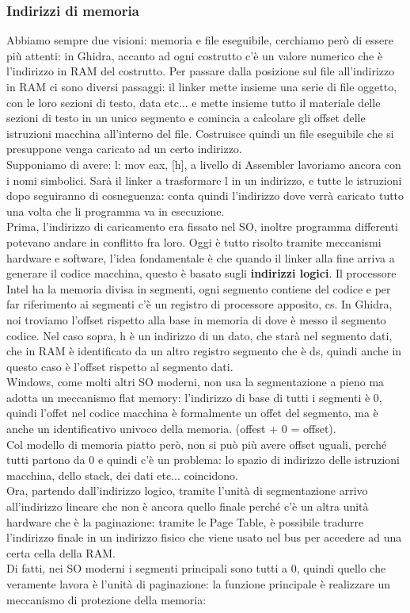 \documentclass[12pt, oneside]{extbook}
\begin{document}
\subsubsection{Indirizzi di memoria}
Abbiamo sempre due visioni: memoria e file eseguibile, cerchiamo però di essere più attenti: in Ghidra, accanto ad ogni costrutto c'è un valore numerico che è l'indirizzo in RAM del costrutto. Per passare dalla posizione sul file all'indirizzo in RAM ci sono diversi passaggi: il linker mette insieme una serie di file oggetto, con le loro sezioni di testo, data etc... e mette insieme tutto il materiale delle sezioni di testo in un unico segmento e comincia a calcolare gli offset delle istruzioni macchina all'interno del file. Costruisce quindi un file eseguibile che si presuppone venga caricato ad un certo indirizzo.\\ Supponiamo di avere: \textsf{l: mov eax, [h]}, a livello di Assembler lavoriamo ancora con i nomi simbolici. Sarà il linker a trasformare l in un indirizzo, e tutte le istruzioni dopo seguiranno di cosneguenza: conta quindi l'indirizzo dove verrà caricato tutto una volta che li programma va in esecuzione.\\ Prima, l'indirizzo di caricamento era fissato nel SO, inoltre programma differenti potevano andare in conflitto fra loro. Oggi è tutto risolto tramite meccanismi hardware e software, l'idea fondamentale è che quando il linker alla fine arriva a generare il codice macchina, questo è basato sugli \textbf{indirizzi logici}. Il processore Intel ha la memoria divisa in segmenti, ogni segmento contiene del codice e per far riferimento ai segmenti c'è un registro di processore apposito, \textsf{cs}. In Ghidra, noi troviamo l'offset rispetto alla base in memoria di dove è messo il segmento codice. Nel caso sopra, h è un indirizzo di un dato, che starà nel segmento dati, che in RAM è identificato da un altro registro segmento che è \textsf{ds}, quindi anche in questo caso è l'offset rispetto al segmento dati.\\ Windows, come molti altri SO moderni, non usa la segmentazione a pieno ma adotta un meccanismo flat memory: l'indirizzo di base di tutti i segmenti è 0, quindi l'offet nel codice macchina è formalmente un offet del segmento, ma è anche un identificativo univoco della memoria. (offest + 0 = offset).\\ Col modello di memoria piatto però, non si può più avere offset uguali, perché tutti partono da 0 e quindi c'è un problema: lo spazio di indirizzo delle istruzioni macchina, dello stack, dei dati etc... coincidono.\\ Ora, partendo dall'indirizzo logico, tramite l'unità di segmentazione arrivo all'indirizzo lineare che non è ancora quello finale perché c'è un altra unità hardware che è la paginazione: tramite le Page Table, è possibile tradurre l'indirizzo finale in un indirizzo fisico che viene usato nel bus per accedere ad una certa cella della RAM.\\ Di fatti, nei SO moderni i segmenti principali sono tutti a 0, quindi quello che veramente lavora è l'unità di paginazione: la funzione principale è realizzare un meccanismo di protezione della memoria:
\end{document}
